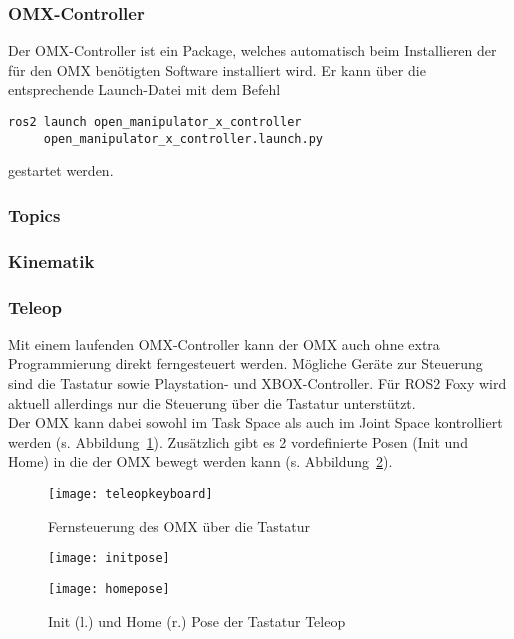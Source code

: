 \subsubsection{OMX-Controller}
Der OMX-Controller ist ein Package, welches automatisch beim Installieren der für den OMX benötigten Software installiert wird.
Er kann über die entsprechende Launch-Datei mit dem Befehl
\begin{verbatim}
ros2 launch open_manipulator_x_controller 
     open_manipulator_x_controller.launch.py
\end{verbatim}
gestartet werden.



\subsubsection{Topics}



\subsubsection{Kinematik}


\subsubsection{Teleop} \label{teleop}
Mit einem laufenden OMX-Controller kann der OMX auch ohne extra Programmierung direkt ferngesteuert werden.
Mögliche Geräte zur Steuerung sind die Tastatur sowie Playstation- und XBOX-Controller.
Für \ac{ROS2} Foxy wird aktuell allerdings nur die Steuerung über die Tastatur unterstützt.\\
Der OMX kann dabei sowohl im Task Space als auch im Joint Space kontrolliert werden (s. Abbildung~\ref{fig:teleopkeyboard}).
Zusätzlich gibt es 2 vordefinierte Posen (Init und Home) in die der OMX bewegt werden kann (s. Abbildung~\ref{fig:teleopposes}).
\begin{figure}[ht!]
\centering
\texttt{[image: teleopkeyboard]}
\caption{Fernsteuerung des OMX über die Tastatur}
\label{fig:teleopkeyboard}
\end{figure}
\begin{figure}[htb]
    \centering
    \begin{minipage}[t]{0.45\linewidth}
        \centering
        \texttt{[image: initpose]}
    \end{minipage}%
    \hfill
    \begin{minipage}[t]{0.45\linewidth}
        \centering
        \texttt{[image: homepose]}
    \end{minipage}
    \caption{Init (l.) und Home (r.) Pose der Tastatur Teleop}
    \label{fig:teleopposes}
\end{figure}



